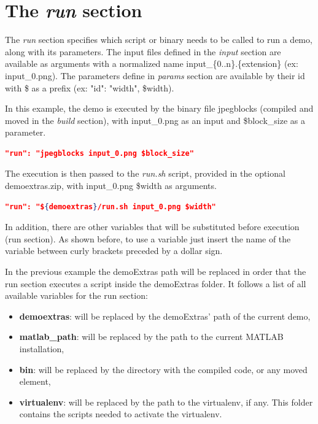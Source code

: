 \section{The \emph{run} section}

The \emph{run} section specifies which script or binary needs to be called to run a demo, along with its parameters. The input files defined in the \emph{input} section are available as arguments with a normalized name input\_\{0..n\}.\{extension\} (ex: input\_0.png). The parameters define in \emph{params} section are available by their id with \$ as a prefix (ex: "id": "width", \$width).

In this example, the demo is executed by the binary file jpegblocks (compiled and moved in the \emph{build} section), with input\_0.png as an input and \$block\_size as a parameter.
\begin{lstlisting}[language=json,firstnumber=1]
  "run": "jpegblocks input_0.png $block_size"\end{lstlisting}

The execution is then passed to the \emph{run.sh} script, provided in the optional demoextras.zip, with input\_0.png \$width as arguments.
\begin{lstlisting}[language=json,firstnumber=1]
  "run": "${demoextras}/run.sh input_0.png $width"
\end{lstlisting}

In addition, there are other variables that will be substituted before execution (run section). As shown before, to use a variable just insert the name of the variable between curly brackets preceded by a dollar sign.

In the previous example the demoExtras path will be replaced in order that the run section executes a script inside the demoExtras folder. It follows a list of all available variables for the run section:

\begin{itemize}
  \item \textbf{demoextras}: will be replaced by the demoExtras' path of the current demo,
  \item \textbf{matlab\_path}: will be replaced by the path to the current MATLAB installation,
  \item \textbf{bin}: will be replaced by the directory with the compiled code, or any moved element,
  \item \textbf{virtualenv}: will be replaced by the path to the virtualenv, if any. This folder contains the scripts needed to activate the virtualenv.
\end{itemize}


